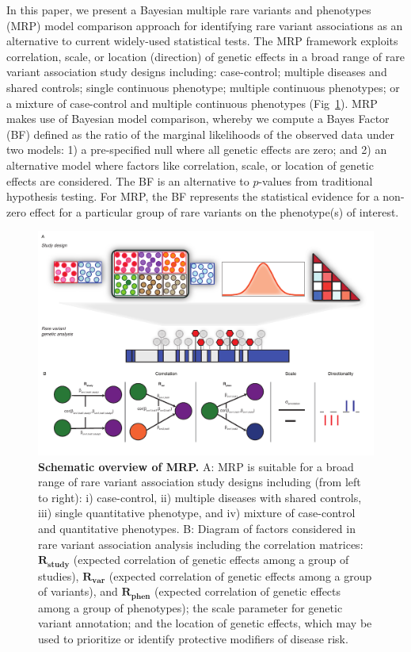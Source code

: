 In this paper, we present a Bayesian multiple rare variants and phenotypes (MRP) model comparison approach for identifying rare variant associations as an alternative to current widely-used statistical tests. The MRP framework exploits correlation, scale, or location (direction) of genetic effects in a broad range of rare variant association study designs including: case-control; multiple diseases and shared controls; single continuous phenotype; multiple continuous phenotypes; or a mixture of case-control and multiple continuous phenotypes (Fig~\ref{overview}). MRP makes use of Bayesian model comparison, whereby we compute a Bayes Factor (BF) defined as the ratio of the marginal likelihoods of the observed data under two models: 1) a pre-specified null where all genetic effects are zero; and 2) an alternative model where factors like correlation, scale, or location of genetic effects are considered. The BF is an alternative to $p$-values from traditional hypothesis testing. For MRP, the BF represents the statistical evidence for a non-zero effect for a particular group of rare variants on the phenotype(s) of interest.

\begin{figure}[!h]
\includegraphics[width=\textwidth]{../figures/final/Figure_01.pdf}
\caption{{\bf Schematic overview of MRP.}
A: MRP is suitable for a broad range of rare variant association study designs including (from left to right): i) case-control, ii) multiple diseases with shared controls, iii) single quantitative phenotype, and iv) mixture of case-control and quantitative phenotypes. B: Diagram of factors considered in rare variant association analysis including the correlation matrices: $\mathbf{R_{\textrm{study}}}$  (expected correlation of genetic effects among a group of studies), $\mathbf{R_{\textrm{var}}}$ (expected correlation of genetic effects among a group of variants), and $\mathbf{R_{\textrm{phen}}}$ (expected correlation of genetic effects among a group of phenotypes); the scale parameter for genetic variant annotation; and the location of genetic effects, which may be used to prioritize or identify protective modifiers of disease risk.}
\label{overview}
\end{figure}

